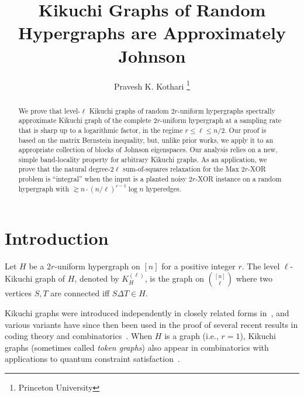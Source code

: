 \documentclass
[11pt,letterpaper]
{article}
\providecommand*{\bm}[1]{\boldsymbol{#1}}
\begin{document}
\pagestyle{plain}
\setcounter{page}{1}

\title{Kikuchi Graphs of Random Hypergraphs are Approximately Johnson}
\author{Pravesh K. Kothari \thanks{Princeton University}}
\maketitle
\begin{abstract}
We prove that level-$\ell$ Kikuchi graphs of random $2r$-uniform hypergraphs spectrally approximate Kikuchi graph of the complete $2r$-uniform hypergraph at a sampling rate that is sharp up to a logarithmic factor, in the regime $r\leq \ell \leq n/2$. Our proof is based on the matrix Bernstein inequality, but, unlike prior works, we apply it to an appropriate collection of blocks of Johnson eigenspaces. Our analysis relies on a new, simple band-locality property for arbitrary Kikuchi graphs. As an application, we prove that the natural degree-$2\ell$ sum-of-squares relaxation for the Max $2r$-XOR problem is ``integral'' when the input is a planted noisy $2r$-XOR instance on a random hypergraph with $\gtrsim n \cdot (n/\ell)^{r-1} \log n$ hyperedges. 
\end{abstract} 

\newpage
\newcommand{\ba}{\bar{\alpha}}
\newcommand{\bb}{\bar{\beta}}
\newcommand{\bx}{\bar{s}}
\newcommand{\bz}{\bar{z}}
\newcommand{\by}{\bar{t}}
\newcommand{\1}{\bm{1}}
\newcommand{\Hf}{H_{\mathsf{full}}}
\newcommand{\Span}{\mathsf{span}}

\section{Introduction}
Let $H$ be a $2r$-uniform hypergraph on $[n]$ for a positive integer $r$. The level $\ell$-Kikuchi graph of $H$, denoted by $K^{(\ell)}_H$, is the graph on ${[n] \choose \ell}$ where two vertices $S,T$ are connected iff $S \Delta T \in H$. 

Kikuchi graphs were introduced independently in closely related forms in~\cite{WeinAM19,Hastings20TensorPCA}, and various variants have since then been used in the proof of several recent results in coding theory and combinatorics~\cite{GuruswamiKM22,HsiehKM23,GHKM23,AlrabiahGKM22,KothariManohar24LinearLCC,KothariManohar24SmoothLCC,HsiehKothariMohantyMunhaSudakov24,Yankovitz24Linear3LCC,BasuHsiehKothariLin25OddLDC}. When $H$ is a graph (i.e., $r=1$), Kikuchi graphs (sometimes called \emph{token graphs}) also appear in combinatorics with applications to quantum constraint satisfaction~\cite{FabilaMonroyFFHUW12,ApteParekhSud25,BakshiBasuKothariLi26,Lew26ApproxBrouwer,DalfoDFFHTZ21,Lew24TokenGraphs,DalfoFM25,ReyesDalfoFiolMessegue23}. 
\end{document}

